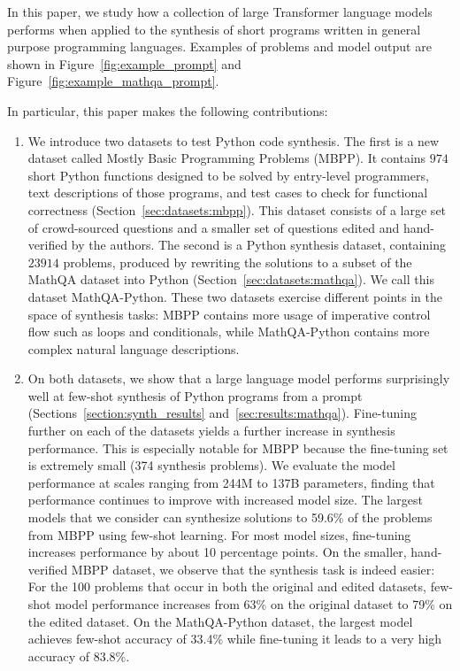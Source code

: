 In this paper, we study how a collection of large Transformer language models performs when applied to the synthesis of short programs written in general purpose programming languages. Examples of problems and model output are shown in Figure~\ref{fig:example_prompt} and Figure~\ref{fig:example_mathqa_prompt}.

In particular, this paper makes the following contributions:

\begin{enumerate}
    \item We introduce two datasets to test Python code synthesis. The first is a new dataset called Mostly Basic Programming Problems (MBPP). It contains $974$ short Python functions designed to be solved by entry-level programmers, text descriptions of those programs, and test cases to check for functional correctness (Section~\ref{sec:datasets:mbpp}). This dataset consists of a large set of crowd-sourced questions and a smaller set of questions edited and hand-verified by the authors. The second is a Python synthesis dataset, containing $23914$ problems, produced by rewriting the solutions to a subset of the MathQA dataset \citep{MATHQA} into Python (Section~\ref{sec:datasets:mathqa}). We call this dataset MathQA-Python. These two datasets exercise different points in the space of synthesis tasks: MBPP contains more usage of imperative control flow such as loops and conditionals, while MathQA-Python contains more complex natural language descriptions.

    \item On both datasets, we show that a large language model performs surprisingly well at few-shot synthesis of Python programs from a prompt (Sections~\ref{section:synth_results} and~\ref{sec:results:mathqa}). Fine-tuning further on each of the datasets yields a further increase in synthesis performance. This is especially notable for MBPP because the fine-tuning set is extremely small (374 synthesis problems). We evaluate the model performance at scales ranging from 244M to 137B parameters, finding that performance continues to improve with increased model size. The largest models that we consider can synthesize solutions to 59.6\% of the problems from MBPP using few-shot learning. For most model sizes, fine-tuning increases performance by about 10 percentage points. On the smaller, hand-verified MBPP dataset, we observe that the synthesis task is indeed easier: For the 100 problems that occur in both the original and edited datasets, few-shot model performance increases from 63\% on the original dataset to 79\% on the edited dataset. On the MathQA-Python dataset, the largest model achieves few-shot accuracy of 33.4\% while fine-tuning it leads to a very high accuracy of 83.8\%.


\end{enumerate}
